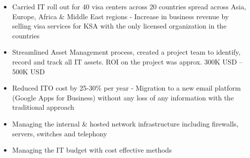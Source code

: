 \documentclass[10pt,a4paper,ragged2e]{altacv}
\begin{document}
\divider

\begin{itemize}
\item Carried IT roll out for 40 visa centers across 20 countries spread across Asia, Europe, Africa \& Middle East regions - Increase in business revenue by selling visa services for KSA with the only licensed organization in the countries  
\item Streamlined Asset Management process, created a project team to identify, record and track all IT assets. ROI on the project was approx. 300K USD – 500K USD
\item Reduced ITO cost by 25-30\% per year - Migration to a new email platform (Google Apps for Business) without any loss of any information with the traditional approach
\end{itemize}

\divider

\begin{itemize}
\item Managing the internal \& hosted network infrastructure including firewalls, servers, switches and telephony
\item Managing the IT budget with cost effective methods
\end{itemize}

\divider


%


\end{document}
